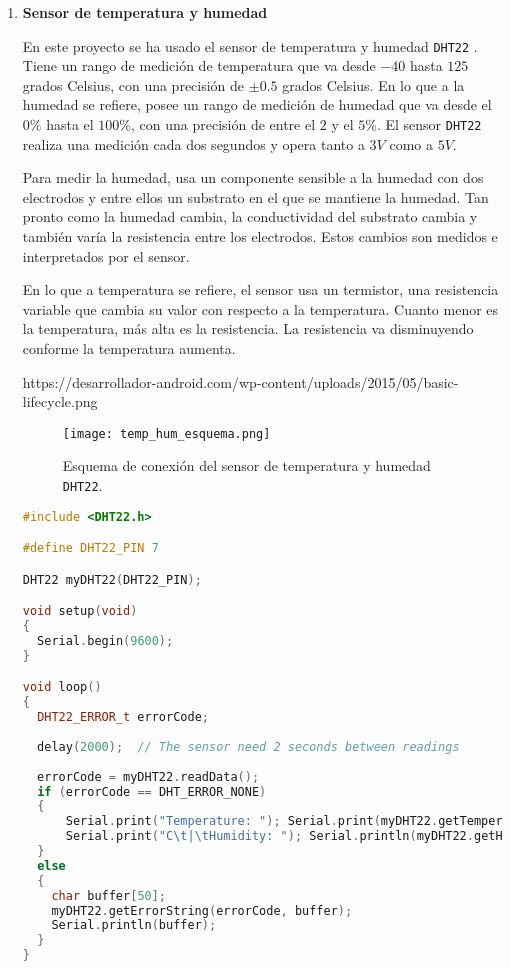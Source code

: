 \begin{enumerate}
\item \textbf{Sensor de temperatura y humedad}

En este proyecto se ha usado el sensor de temperatura y humedad \texttt{DHT22} \cite{26}. Tiene un rango de medición de temperatura que va desde $-40$ hasta $125$ grados Celsius, con una precisión de $\pm0.5$ grados Celsius. En lo que a la humedad se refiere, posee un rango de medición de humedad que va desde el $0\%$ hasta el $100\%$, con una precisión de entre el $2$ y el $5\%$. El sensor \texttt{DHT22} realiza una medición cada dos segundos y opera tanto a $3V$ como a $5V$. 

Para medir la humedad, usa un componente sensible a la humedad con dos electrodos y entre ellos un substrato en el que se mantiene la humedad. Tan pronto como la humedad cambia, la conductividad del substrato cambia y también varía la resistencia entre los electrodos. Estos cambios son medidos e interpretados por el sensor.

En lo que a temperatura se refiere, el sensor usa un termistor, una resistencia variable que cambia su valor con respecto a la temperatura. Cuanto menor es la temperatura, más alta es la resistencia. La resistencia va disminuyendo conforme la temperatura aumenta. 

https://desarrollador-android.com/wp-content/uploads/2015/05/basic-lifecycle.png
\begin{figure}[!h]
\begin{center}
\texttt{[image: temp\_hum\_esquema.png]}
\caption{Esquema de conexión del sensor de temperatura y humedad \texttt{DHT22}.}
\label{fig:dht22}
\end{center}
\end{figure}

\begin{lstlisting}[language=c++,captionpos=t,caption={\textbf{Utilización básica del sensor de temperatura y humedad DHT22.}},label={lst:basicDHT22}]
#include <DHT22.h>

#define DHT22_PIN 7

DHT22 myDHT22(DHT22_PIN);

void setup(void)
{
  Serial.begin(9600);
}

void loop()
{ 
  DHT22_ERROR_t errorCode;
  
  delay(2000);	// The sensor need 2 seconds between readings
  
  errorCode = myDHT22.readData();
  if (errorCode == DHT_ERROR_NONE)
  {
      Serial.print("Temperature: "); Serial.print(myDHT22.getTemperatureC());
      Serial.print("C\t|\tHumidity: "); Serial.println(myDHT22.getHumidity());
  }
  else
  {
    char buffer[50];
    myDHT22.getErrorString(errorCode, buffer);
    Serial.println(buffer);
  } 
}
\end{lstlisting}


\end{enumerate}
